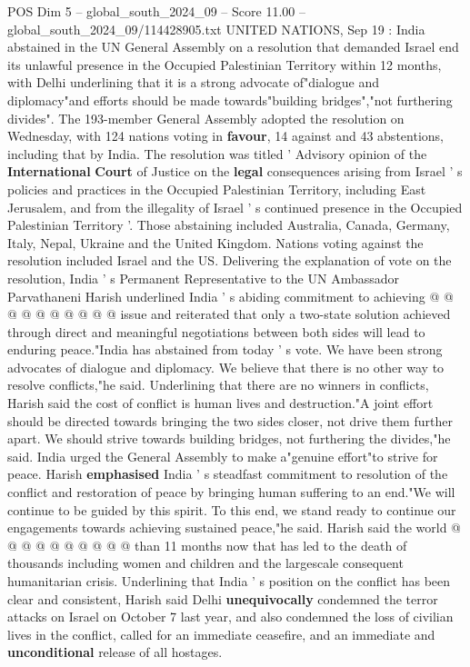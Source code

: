 \begin{textsample}{POS Dim 5 – global\_south\_2024\_09 – Score 11.00 – global\_south\_2024\_09/114428905.txt}  \label{ex:f5_pos_259}
UNITED NATIONS, Sep 19 : India abstained in the UN General Assembly on a resolution that demanded Israel end its unlawful presence in the Occupied Palestinian Territory within 12 months, with Delhi underlining that it is a strong advocate of"dialogue and diplomacy"and efforts should be made towards"building bridges","not furthering divides".
The 193-member General Assembly adopted the resolution on Wednesday, with 124 nations voting in \textbf{favour}, 14 against and 43 abstentions, including that by India.
The resolution was titled ' Advisory opinion of the \textbf{International} \textbf{Court} of Justice on the \textbf{legal} consequences arising from Israel ' s policies and practices in the Occupied Palestinian Territory, including East Jerusalem, and from the illegality of Israel ' s continued presence in the Occupied Palestinian Territory '.
Those abstaining included Australia, Canada, Germany, Italy, Nepal, Ukraine and the United Kingdom.
Nations voting against the resolution included Israel and the US.
Delivering the explanation of vote on the resolution, India ' s Permanent Representative to the UN Ambassador Parvathaneni Harish underlined India ' s abiding commitment to achieving @ @ @ @ @ @ @ @ @ @ issue and reiterated that only a two-state solution achieved through direct and meaningful negotiations between both sides will lead to enduring peace."India has abstained from today ' s vote.
We have been strong advocates of dialogue and diplomacy.
We believe that there is no other way to resolve conflicts,"he said.
Underlining that there are no winners in conflicts, Harish said the cost of conflict is human lives and destruction."A joint effort should be directed towards bringing the two sides closer, not drive them further apart.
We should strive towards building bridges, not furthering the divides,"he said.
India urged the General Assembly to make a"genuine effort"to strive for peace.
Harish \textbf{emphasised} India ' s steadfast commitment to resolution of the conflict and restoration of peace by bringing human suffering to an end."We will continue to be guided by this spirit.
To this end, we stand ready to continue our engagements towards achieving sustained peace,"he said.
Harish said the world @ @ @ @ @ @ @ @ @ @ than 11 months now that has led to the death of thousands including women and children and the largescale consequent humanitarian crisis.
Underlining that India ' s position on the conflict has been clear and consistent, Harish said Delhi \textbf{unequivocally} condemned the terror attacks on Israel on October 7 last year, and also condemned the loss of civilian lives in the conflict, called for an immediate ceasefire, and an immediate and \textbf{unconditional} release of all hostages.

\end{textsample}
